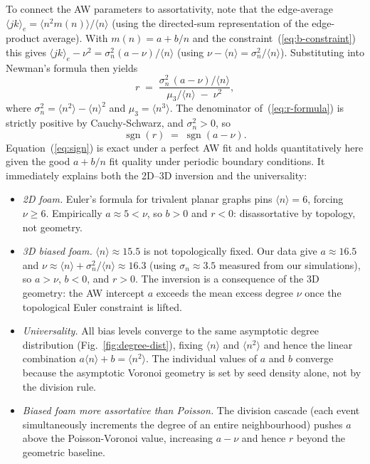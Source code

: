 \documentclass[aps,pre,reprint,amsmath,amssymb,floatfix]{revtex4-2}
\begin{document}
To connect the AW parameters to assortativity, note that the edge-average
$\langle jk\rangle_e = \langle n^2 m(n)\rangle / \langle n\rangle$
(using the directed-sum representation of the edge-product average).
With $m(n)=a+b/n$ and the constraint~(\ref{eq:b-constraint}) this gives
$\langle jk\rangle_e - \nu^2 = \sigma_n^2(a-\nu)/\langle n\rangle$
(using $\nu-\langle n\rangle=\sigma_n^2/\langle n\rangle$).
Substituting into Newman's formula then yields
\begin{equation}
  r \;=\; \frac{\sigma_n^2\,(a-\nu)/\langle n\rangle}
               {\mu_3/\langle n\rangle \;-\; \nu^2},
  \label{eq:r-formula}
\end{equation}
where $\sigma_n^2=\langle n^2\rangle-\langle n\rangle^2$ and
$\mu_3=\langle n^3\rangle$.
The denominator of~(\ref{eq:r-formula}) is strictly positive by
Cauchy-Schwarz, and $\sigma_n^2>0$, so
\begin{equation}
  \operatorname{sgn}(r) \;=\; \operatorname{sgn}(a-\nu).
  \label{eq:sign}
\end{equation}
Equation~(\ref{eq:sign}) is exact under a perfect AW fit and holds
quantitatively here given the good $a+b/n$ fit quality under periodic
boundary conditions.
It immediately explains both the 2D--3D inversion and the universality:

\begin{itemize}
  \item \emph{2D foam.}  Euler's formula for trivalent planar graphs pins
    $\langle n\rangle=6$, forcing $\nu\geq6$.  Empirically $a\approx5<\nu$,
    so $b>0$ and $r<0$: disassortative by topology, not geometry.
  \item \emph{3D biased foam.}  $\langle n\rangle\approx15.5$ is not
    topologically fixed.  Our data give $a\approx16.5$ and
    $\nu\approx\langle n\rangle+\sigma_n^2/\langle n\rangle\approx16.3$
    (using $\sigma_n\approx3.5$ measured from our simulations), so $a>\nu$,
    $b<0$, and $r>0$.  The inversion is a consequence of the 3D geometry:
    the AW intercept $a$ exceeds the mean excess degree $\nu$ once the
    topological Euler constraint is lifted.
  \item \emph{Universality.}  All bias levels converge to the same
    asymptotic degree distribution (Fig.~\ref{fig:degree-dist}), fixing
    $\langle n\rangle$ and $\langle n^2\rangle$ and hence the linear
    combination $a\langle n\rangle+b=\langle n^2\rangle$.  The individual
    values of $a$ and $b$ converge because the asymptotic Voronoi geometry
    is set by seed density alone, not by the division rule.
  \item \emph{Biased foam more assortative than Poisson.}  The division
    cascade (each event simultaneously increments the degree of an entire
    neighbourhood) pushes $a$ above the Poisson-Voronoi value, increasing
    $a-\nu$ and hence $r$ beyond the geometric baseline.
\end{itemize}
\end{document}
